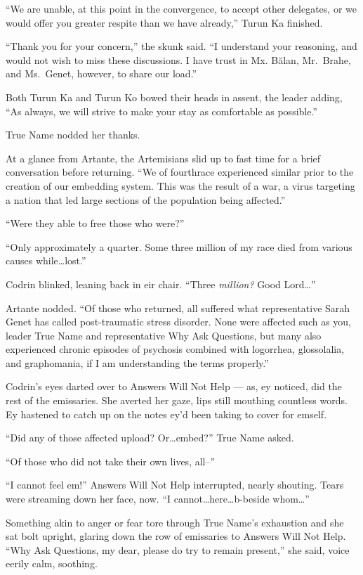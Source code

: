 ``We are unable, at this point in the convergence, to accept other delegates, or we would offer you greater respite than we have already,'' Turun Ka finished.

``Thank you for your concern,'' the skunk said. ``I understand your reasoning, and would not wish to miss these discussions. I have trust in Mx. Bălan, Mr.~Brahe, and Ms.~Genet, however, to share our load.''

Both Turun Ka and Turun Ko bowed their heads in assent, the leader adding, ``As always, we will strive to make your stay as comfortable as possible.''

True Name nodded her thanks.

At a glance from Artante, the Artemisians slid up to fast time for a brief conversation before returning. ``We of fourthrace experienced similar prior to the creation of our embedding system. This was the result of a war, a virus targeting a nation that led large sections of the population being affected.''

``Were they able to free those who were?''

``Only approximately a quarter. Some three million of my race died from various causes while\ldots lost.''

Codrin blinked, leaning back in eir chair. ``Three \emph{million?} Good Lord\ldots{}''

Artante nodded. ``Of those who returned, all suffered what representative Sarah Genet has called post-traumatic stress disorder. None were affected such as you, leader True Name and representative Why Ask Questions, but many also experienced chronic episodes of psychosis combined with logorrhea, glossolalia, and graphomania, if I am understanding the terms properly.''

Codrin's eyes darted over to Answers Will Not Help — as, ey noticed, did the rest of the emissaries. She averted her gaze, lips still mouthing countless words. Ey hastened to catch up on the notes ey'd been taking to cover for emself.

``Did any of those affected upload? Or\ldots embed?'' True Name asked.

``Of those who did not take their own lives, all--''

``I cannot feel em!'' Answers Will Not Help interrupted, nearly shouting. Tears were streaming down her face, now. ``I cannot\ldots here\ldots b-beside whom\ldots{}''

Something akin to anger or fear tore through True Name's exhaustion and she sat bolt upright, glaring down the row of emissaries to Answers Will Not Help. ``Why Ask Questions, my dear, please do try to remain present,'' she said, voice eerily calm, soothing.

